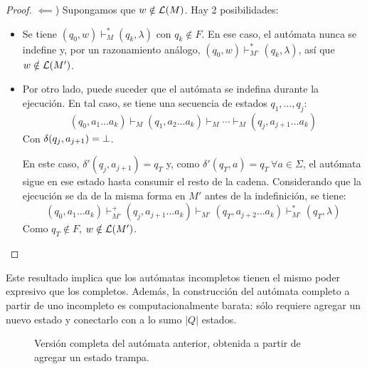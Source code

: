 \begin{proof}
    $\impliedby$) Supongamos que $w \notin \mathcal{L}(M)$. Hay 2 posibilidades:
    \begin{itemize}
        \item Se tiene $(q_0, w) \vdash_M^* (q_k, \lambda)$ con $q_k \notin F$. En ese caso, el autómata nunca se indefine y, por un razonamiento análogo, $(q_0, w) \vdash_{M'}^* (q_k, \lambda)$, así que $w \notin \mathcal{L}(M')$.
        \item Por otro lado, puede suceder que el autómata se indefina durante la ejecución. En tal caso, se tiene una secuencia de estados $q_1, \dots, q_j$:
              $$(q_0, a_1 \dots a_k) \vdash_M (q_1, a_2 \dots a_k) \vdash_M \cdots \vdash_M (q_j, a_{j+1} \dots a_k)$$
              Con $\delta(q_j, a_{j+1}) = \mathrm \perp$.

              En este caso, $\delta' (q_j, a_{j+1}) = q_T$ y, como $\delta'(q_T, a) = q_T\ \forall a \in \Sigma$, el autómata sigue en ese estado hasta consumir el resto de la cadena. Considerando que la ejecución se da de la misma forma en $M'$ antes de la indefinición, se tiene:
              $$(q_0, a_1 \dots a_k) \vdash_{M'}^+ (q_j, a_{j+1} \dots a_k) \vdash_{M'} (q_T, a_{j+2} \dots a_k) \vdash_{M'}^* (q_T, \lambda)$$
              Como $q_T \notin F$, $w \notin \mathcal{L}(M')$.
    \end{itemize}
\end{proof}

Este resultado implica que los autómatas incompletos tienen el mismo poder expresivo que los completos. Además, la construcción del autómata completo a partir de uno incompleto es computacionalmente barata: sólo requiere agregar un nuevo estado y conectarlo con a lo sumo $|Q|$ estados.

\begin{figure}[H]
    \centering
    \caption*{Versión completa del autómata anterior, obtenida a partir de agregar un estado trampa.}
\end{figure}

